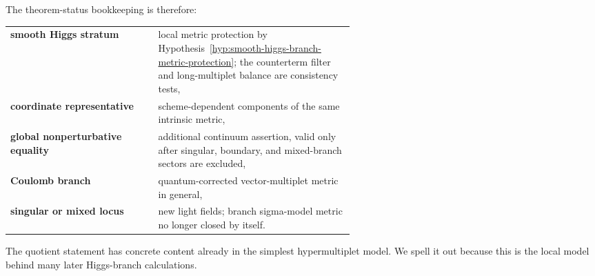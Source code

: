 The theorem-status bookkeeping is therefore:
\begin{center}
\begin{tabular}{@{}lp{0.58\linewidth}@{}}
\textbf{smooth Higgs stratum} & local metric protection by
Hypothesis~\ref{hyp:smooth-higgs-branch-metric-protection}; the counterterm
filter and long-multiplet balance are consistency tests,\\[0.2em]
\textbf{coordinate representative} & scheme-dependent components of the same
intrinsic metric,\\[0.2em]
\textbf{global nonperturbative equality} & additional continuum assertion,
valid only after singular, boundary, and mixed-branch sectors are excluded,\\[0.2em]
\textbf{Coulomb branch} & quantum-corrected vector-multiplet metric in
general,\\[0.2em]
\textbf{singular or mixed locus} & new light fields; branch sigma-model metric
no longer closed by itself.
\end{tabular}
\end{center}

The quotient statement has concrete content already in the simplest
hypermultiplet model.  We spell it out because this is the local model behind
many later Higgs-branch calculations.

